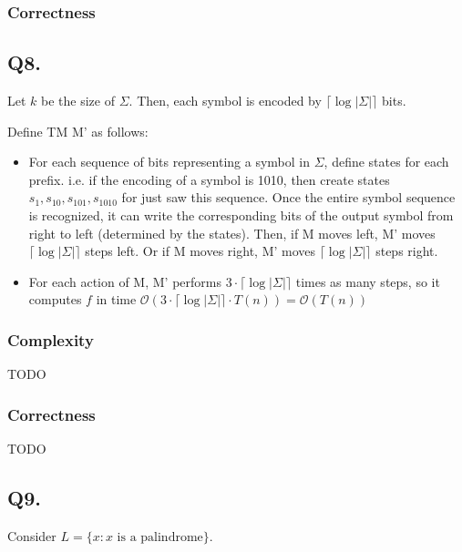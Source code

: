 \documentclass[letterpaper]{article}
\begin{document}
\subsubsection*{Correctness}

\subsection*{Q8.}

Let $k$ be the size of $\Sigma$. Then, each symbol is encoded by
$\lceil \log \lvert \Sigma \rvert \rceil$ bits.

Define TM M' as follows:
\begin{itemize}
      \item For each sequence of bits representing a symbol in $\Sigma$, define
            states for each prefix. i.e. if the encoding of a symbol is 1010, then
            create states $s_{1}, s_{10}, s_{101}, s_{1010}$ for just saw this sequence.
            Once the entire symbol sequence is recognized, it can write the corresponding
            bits of the output symbol from right to left (determined by the states).
            Then, if M moves left, M' moves $\lceil \log \lvert \Sigma \rvert \rceil$
            steps left. Or if M moves right, M' moves $\lceil \log \lvert \Sigma \rvert \rceil$
            steps right.
      \item For each action of M, M' performs
            $3 \cdot \lceil \log \lvert \Sigma \rvert \rceil$
            times as many steps, so it computes $f$ in time
            $\mathcal{O}(3 \cdot \lceil \log \lvert \Sigma \rvert \rceil \cdot T(n)) = \mathcal{O}(T(n))$
\end{itemize}

\subsubsection*{Complexity}

TODO

\subsubsection*{Correctness}

TODO

\subsection*{Q9.}

Consider $L = \{x : x \text{ is a palindrome}\}$.
\end{document}

